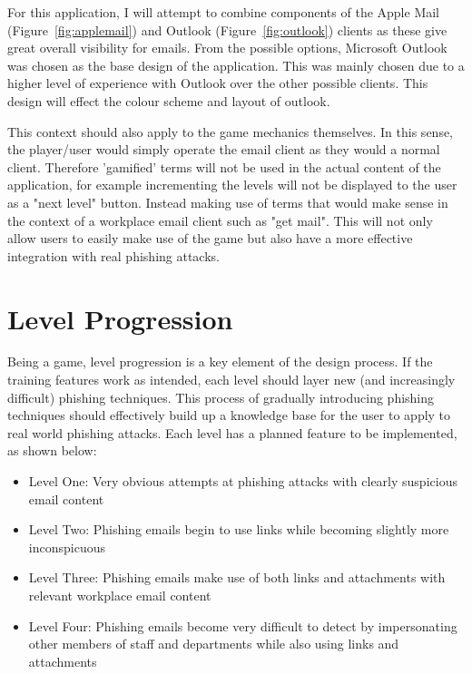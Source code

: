 \documentclass{l4proj}
\begin{document}
For this application, I will attempt to combine components of the Apple Mail (Figure~\ref{fig:applemail}) and Outlook (Figure~\ref{fig:outlook}) clients as these give great overall visibility for emails. From the possible options, Microsoft Outlook was chosen as the base design of the application. This was mainly chosen due to a higher level of experience with Outlook over the other possible clients. This design will effect the colour scheme and layout of outlook.

This context should also apply to the game mechanics themselves. In this sense, the player/user would simply operate the email client as they would a normal client. Therefore 'gamified' terms will not be used in the actual content of the application, for example incrementing the levels will not be displayed to the user as a "next level" button. Instead making use of terms that would make sense in the context of a workplace email client such as "get mail". This will not only allow users to easily make use of the game but also have a more effective integration with real phishing attacks.

\section{Level Progression}
Being a game, level progression is a key element of the design process. If the training features work as intended, each level should layer new (and increasingly difficult) phishing techniques. This process of gradually introducing phishing techniques should effectively build up a knowledge base for the user to apply to real world phishing attacks. Each level has a planned feature to be implemented, as shown below:
\begin{itemize}
    \item Level One: Very obvious attempts at phishing attacks with clearly suspicious email content
    \item Level Two: Phishing emails begin to use links while becoming slightly more inconspicuous 
    \item Level Three: Phishing emails make use of both links and attachments with relevant workplace email content
    \item Level Four: Phishing emails become very difficult to detect by impersonating other members of staff and departments while also using links and attachments
\end{itemize}
\end{document}
